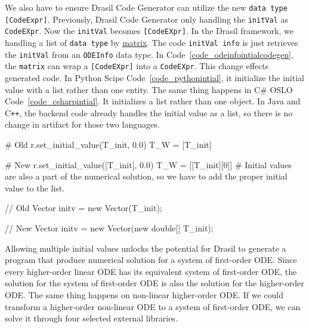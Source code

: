 We also have to ensure Drasil Code Generator can utilize the new \verb|data type| \verb|[CodeExpr]|. Previously, Drasil Code Generator only handling the \verb|initVal| as \verb|CodeEXpr|. Now the \verb|initVal| becomes \verb|[CodeEXpr]|. In the Drasil framework, we handling a list of \verb|data type| by \href{https://jacquescarette.github.io/Drasil/docs/drasil-code-base-0.1.9.0/Language-Drasil-CodeExpr.html#v:matrix}{matrix}. The code \verb|initVal info| is just retrieves the \verb|initVal| from an \verb|ODEInfo| data type. In Code~\ref{code_odeinfointialcodegen}, the \verb|matrix| can wrap a \verb|[CodeEXpr]| into a \verb|CodeEXpr|. This change effects generated code. In Python Scipe Code~\ref{code_pythonintial}, it initialize the initial value with a list rather than one entity. The same thing happens in C\# OSLO Code~\ref{code_csharpintial}. It initializes a list rather than one object. In Java and C\texttt{++}, the backend code already handles the initial value as a list, so there is no change in artifact for those two languages. 

\begin{listing}[ht]
\begin{python1}
# Old 
  r.set_initial_value(T_init, 0.0)
  T_W = [T_init]

# New 
  r.set_initial_value([T_init], 0.0)
  T_W = [[T_init][0]] # Initial values are also a part of the numerical solution, so we have to add the proper initial value to the list.
\end{python1}
\label{code_pythonintial}
\end{listing}

\begin{listing}[ht]
\begin{csharp1}
// Old 
Vector initv = new Vector(T_init);

// New 
Vector initv = new Vector(new double[] {T_init});
\end{csharp1}
\label{code_csharpintial}
\end{listing}

Allowing multiple initial values unlocks the potential for Drasil to generate a program that produce numerical solution for a system of first-order ODE. Since every higher-order linear ODE has its equivalent system of first-order ODE, the solution for the system of first-order ODE is also the solution for the higher-order ODE. The same thing happens on non-linear higher-order ODE. If we could transform a higher-order non-linear ODE to a system of first-order ODE, we can solve it through four selected external libraries. 

